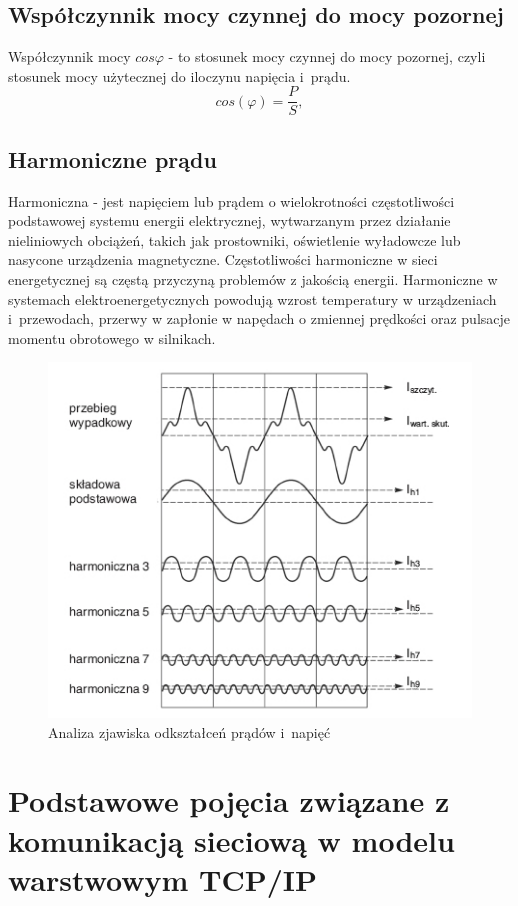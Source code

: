 \documentclass[12pt]{article}
\begin{document}
\subsection{Współczynnik mocy czynnej do mocy pozornej}
Współczynnik mocy $cos{\varphi}$ - to stosunek mocy czynnej do mocy pozornej, czyli stosunek mocy użytecznej do iloczynu napięcia i~prądu.
\begin{equation}
    cos(\varphi) = \frac{P}{S},
\end{equation}
\subsection{Harmoniczne prądu}
 Harmoniczna - jest napięciem lub prądem o wielokrotności częstotliwości podstawowej systemu energii elektrycznej, wytwarzanym przez działanie nieliniowych obciążeń, takich jak prostowniki, oświetlenie wyładowcze lub nasycone urządzenia magnetyczne. Częstotliwości harmoniczne w sieci energetycznej są częstą przyczyną problemów z jakością energii. Harmoniczne w systemach elektroenergetycznych powodują wzrost temperatury w urządzeniach i~przewodach, przerwy w zapłonie w napędach o zmiennej prędkości oraz pulsacje momentu obrotowego w silnikach.
\begin{figure}[H]
    \centering
    \includegraphics[scale=0.5]{harmonics}
    \caption{Analiza zjawiska odkształceń prądów i~napięć}
    \label{fig:my_label}
\end{figure}
\section{Podstawowe pojęcia związane z komunikacją sieciową w modelu warstwowym TCP/IP}
\end{document}
